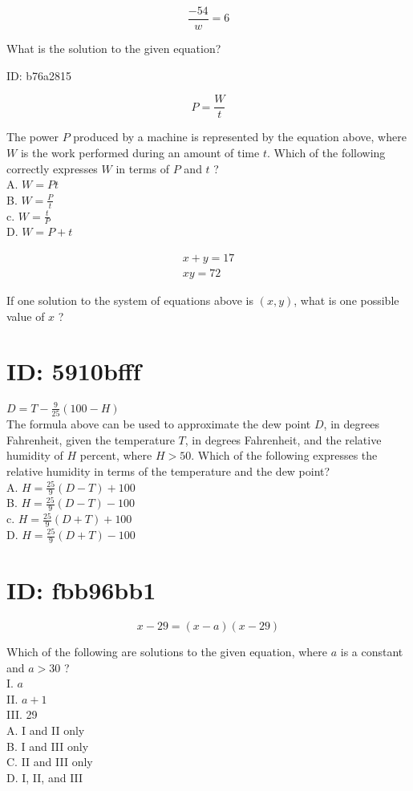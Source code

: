 $$
\frac{-54}{w}=6
$$

What is the solution to the given equation?

ID: b76a2815

$$
P=\frac{W}{t}
$$

The power $P$ produced by a machine is represented by the equation above, where $W$ is the work performed during an amount of time $t$. Which of the following correctly expresses $W$ in terms of $P$ and $t$ ?\\
A. $W=P t$\\
B. $W=\frac{P}{t}$\\
c. $W=\frac{t}{P}$\\
D. $W=P+t$

$$
\begin{array}{r}
x+y=17 \\
x y=72
\end{array}
$$

If one solution to the system of equations above is $(x, y)$, what is one possible value of $x$ ?

\section*{ID: 5910bfff}
$D=T-\frac{9}{25}(100-H)$\\
The formula above can be used to approximate the dew point $D$, in degrees Fahrenheit, given the temperature $T$, in degrees Fahrenheit, and the relative humidity of $H$ percent, where $H>50$. Which of the following expresses the relative humidity in terms of the temperature and the dew point?\\
A. $H=\frac{25}{9}(D-T)+100$\\
B. $H=\frac{25}{9}(D-T)-100$\\
c. $H=\frac{25}{9}(D+T)+100$\\
D. $H=\frac{25}{9}(D+T)-100$

\section*{ID: fbb96bb1}
$$
x-29=(x-a)(x-29)
$$

Which of the following are solutions to the given equation, where $a$ is a constant and $a>30$ ?\\
I. $a$\\
II. $a+1$\\
III. 29\\
A. I and II only\\
B. I and III only\\
C. II and III only\\
D. I, II, and III

